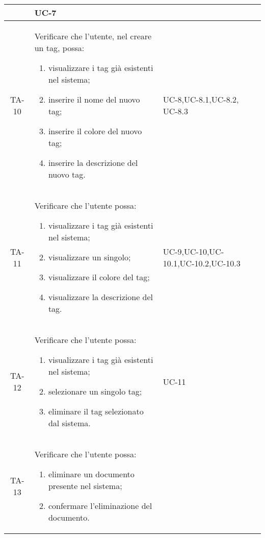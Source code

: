 \begin{xltabular}{\textwidth}{| c | X | X | c |}
\begin{enumerate}
    \end{enumerate}& UC-7 & \textcolor{xmarkcolor}{}  \\
    \hline
     TA-10 & Verificare che l’utente, nel creare un tag, possa:
    \begin{enumerate}
        \item visualizzare i tag già esistenti nel sistema;
        \item inserire il nome del nuovo tag;
        \item inserire il colore del nuovo tag;
        \item inserire la descrizione del nuovo tag.
    \end{enumerate}& UC-8,\newline UC-8.1,\newline UC-8.2, \newline UC-8.3 & \textcolor{xmarkcolor}{} \\
    \hline
    TA-11 & Verificare che l’utente possa:
    \begin{enumerate}
        \item visualizzare i tag già esistenti nel sistema;
        \item visualizzare un singolo;
        \item visualizzare il colore del tag;
        \item visualizzare la descrizione del tag.
    \end{enumerate}& UC-9,\newline UC-10,\newline UC-10.1,\newline UC-10.2,\newline UC-10.3 & \textcolor{xmarkcolor}{} \\
    \hline
     TA-12 & Verificare che l’utente possa:
    \begin{enumerate}
        \item visualizzare i tag già esistenti nel sistema;
        \item selezionare un singolo tag;
        \item eliminare il tag selezionato dal sistema.
    \end{enumerate}& UC-11 & \textcolor{xmarkcolor}{} \\
    \hline
     TA-13 & Verificare che l’utente possa:
    \begin{enumerate}
        \item eliminare un documento presente nel sistema;
        \item confermare l'eliminazione del documento.

\end{enumerate}
\end{xltabular}
